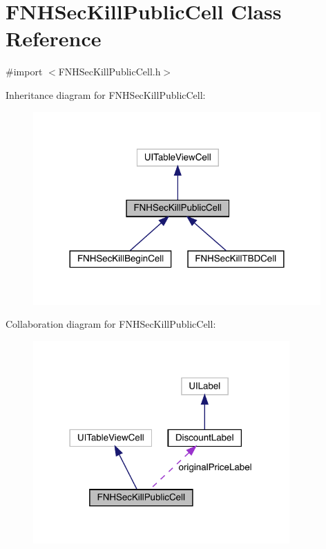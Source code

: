 \hypertarget{interface_f_n_h_sec_kill_public_cell}{}\section{F\+N\+H\+Sec\+Kill\+Public\+Cell Class Reference}
\label{interface_f_n_h_sec_kill_public_cell}


{\ttfamily \#import $<$F\+N\+H\+Sec\+Kill\+Public\+Cell.\+h$>$}



Inheritance diagram for F\+N\+H\+Sec\+Kill\+Public\+Cell\+:\nopagebreak
\begin{figure}[H]
\begin{center}
\leavevmode
\includegraphics[width=312pt]{interface_f_n_h_sec_kill_public_cell__inherit__graph}
\end{center}
\end{figure}


Collaboration diagram for F\+N\+H\+Sec\+Kill\+Public\+Cell\+:\nopagebreak
\begin{figure}[H]
\begin{center}
\leavevmode
\includegraphics[width=278pt]{interface_f_n_h_sec_kill_public_cell__coll__graph}
\end{center}
\end{figure}

